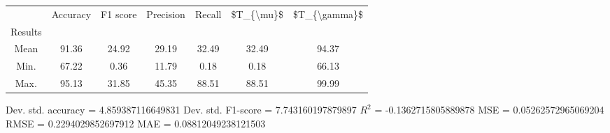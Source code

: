 \begin{tabular}{|c|c|c|c|c|c|c|}
\toprule
{} &  Accuracy &  F1 score &  Precision &  Recall &  \$T\_\{\textbackslash mu\}\$ &  \$T\_\{\textbackslash gamma\}\$ \\
Results &           &           &            &         &            &               \\
\hline
Mean    &     91.36 &     24.92 &      29.19 &   32.49 &      32.49 &         94.37 \\
Min.    &     67.22 &      0.36 &      11.79 &    0.18 &       0.18 &         66.13 \\
Max.    &     95.13 &     31.85 &      45.35 &   88.51 &      88.51 &         99.99 \\
\bottomrule
\end{tabular}

 Dev. std. accuracy = 4.859387116649831
 Dev. std. F1-score = 7.743160197879897
 $R^2$ = -0.1362715805889878
 MSE = 0.05262572965069204
 RMSE = 0.2294029852697912
 MAE = 0.08812049238121503